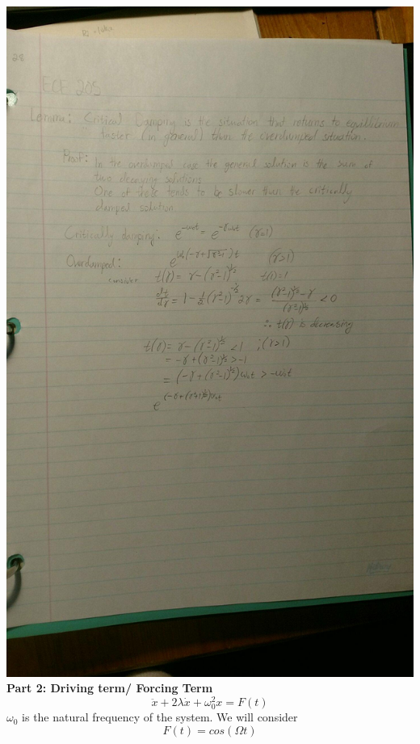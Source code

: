 \documentclass[11pt]{article}
\theoremstyle{definition}
\begin{document}
\includegraphics[width=\textwidth,height=\textheight,keepaspectratio]{friday/6.jpg}\\
\restoregeometry
\clearpage
\newpage
\textbf{Part 2: Driving term/ Forcing Term}
$$\ddot{x} + 2\lambda \dot{x} + \omega_0^2x = F(t)$$
$\omega_0$ is the natural frequency of the system.
We will consider $$F(t) = cos(\Omega t)$$
\end{document}
